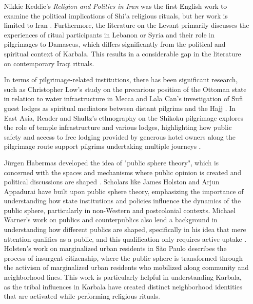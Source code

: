 Nikkie Keddie's \emph{Religion and Politics in Iran} was the first English work to examine the political implications of Shi'a religious rituals, but her work is limited to Iran \cite{keddie_religion_1983}. Furthermore, the literature on the Levant primarily discusses the experiences of ritual participants in Lebanon or Syria and their role in pilgrimages to Damascus, which differs significantly from the political and spiritual context of Karbala. This results in a considerable gap in the literature on contemporary Iraqi rituals.

In terms of pilgrimage-related institutions, there has been significant research, such as Christopher Low's study on the precarious position of the Ottoman state in relation to water infrastructure in Mecca \cite{low_imperial_2020} and Lala Can's investigation of Sufi guest lodges as spiritual mediators between distant pilgrims and the Hajj \cite{can_spiritual_2020}. In East Asia, Reader and Shultz's ethnography on the Shikoku pilgrimage explores the role of temple infrastructure and various lodges, highlighting how public safety and access to free lodging provided by generous hotel owners along the pilgrimage route support pilgrims undertaking multiple journeys \cite{reader_pilgrims_2021}.

Jürgen Habermas developed the idea of "public sphere theory", which is concerned with the spaces and mechanisms where public opinion is created and political discussions are shaped \cite{habermas_structural_1999}. Scholars like James Holston \cite{holston_insurgent_2008} and Arjun Appadurai \cite{appadurai_fear_2006} have built upon public sphere theory, emphasizing the importance of understanding how state institutions and policies influence the dynamics of the public sphere, particularly in non-Western and postcolonial contexts. Michael Warner's work on publics and counterpublics also lend a background in understanding how different publics are shaped, specifically in his idea that mere attention qualifies as a public, and this qualification only requires active uptake \cite[87]{warner_publics_2010}. Holsten's work on marginalized urban residents in São Paulo describes the process of insurgent citizenship, where the public sphere is transformed through the activism of marginalized urban residents who mobilized along community and neighborhood lines. This work is particularly helpful in understanding Karbala, as the tribal influences in Karbala have created distinct neighborhood identities that are activated while performing religious rituals.

